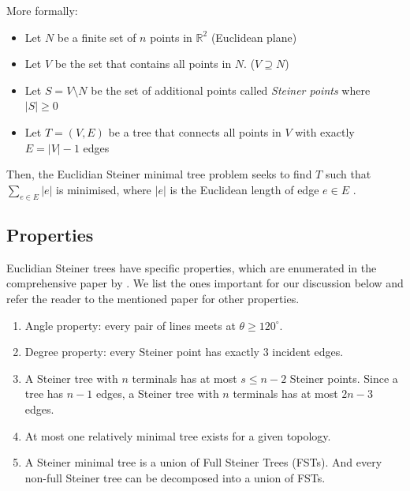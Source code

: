 \documentclass{l4proj}
\begin{document}
More formally:
\begin{itemize}
    \item Let $N$ be a finite set of $n$ points in $\mathbb{R}^2$ (Euclidean plane)
    \item Let $V$ be the set that contains all points in $N$. ($V \supseteq N$)
    \item Let $S = V \setminus N$ be the set of additional points called \textit{Steiner points} where $|S| \geq 0$
    \item Let $T = (V, E)$ be a tree that connects all points in $V$ with exactly $E = |V| - 1$ edges
\end{itemize}

Then, the Euclidian Steiner minimal tree problem seeks to find $T$ such that $\sum_{e \in E} |e|$ is minimised, where $|e|$ is the Euclidean length of edge $e \in E$ \citep{Brazil2014}.

\subsection{Properties}
\label{sec:esmt_properties}
Euclidian Steiner trees have specific properties, which are enumerated in the comprehensive paper by \cite{Gilbert1968SteinerMT}. We list the ones important for our discussion below and refer the reader to the mentioned paper for other properties.

\begin{enumerate}
    \item Angle property: every pair of lines meets at $\theta \geq 120^\circ$.
    \item Degree property: every Steiner point has exactly 3 incident edges.
    \item A Steiner tree with $n$ terminals has at most $s \leq n - 2$ Steiner points. Since a tree has $n - 1$ edges, a Steiner tree with $n$ terminals has at most $2n - 3$ edges.
    \item At most one relatively minimal tree exists for a given topology.
    \item \label{prop:smt_fst} A Steiner minimal tree is a union of Full Steiner Trees (FSTs). And every non-full Steiner tree can be decomposed into a union of FSTs.
\end{enumerate}
\end{document}
